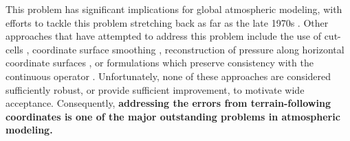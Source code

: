 \documentclass[11pt]{article}
\begin{document}

This problem has significant implications for global atmospheric modeling, with efforts to tackle this problem stretching back as far as the late 1970s \cite{ZIJ1977BzPdA, DTMZIJ1986MAP}.  Other approaches that have attempted to address this problem include the use of cut-cells \cite{JSSHPAD2013GMDD}, coordinate surface smoothing \cite{JBK2011MWR}, reconstruction of pressure along horizontal coordinate surfaces \cite{GZ2012MWR}, or formulations which preserve consistency with the continuous operator \cite{SJL1997QJRMS}.  Unfortunately, none of these approaches are considered sufficiently robust, or provide sufficient improvement, to motivate wide acceptance.  Consequently, \textbf{addressing the errors from terrain-following coordinates is one of the major outstanding problems in atmospheric modeling.}

\end{document}
